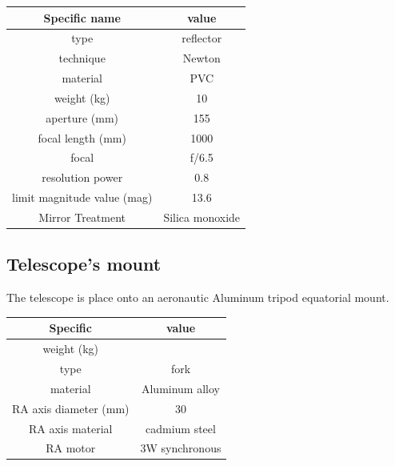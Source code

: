 \documentclass{article}
\begin{document}
\begin{multicols}{2}
\begin{minipage}{0.5\textwidth}
            \centering
            \begin{tabular}{c|c}
                Specific name & value \\
                \hline
                type & reflector \\
                technique & Newton  \\
                material & PVC  \\
                weight (kg) & 10 \\
                aperture (mm) & 155 \\
                focal length (mm) & 1000 \\
                focal & f/6.5 \\
                resolution power & 0.8 \\
                limit magnitude value (mag) & 13.6 \\
                Mirror Treatment & Silica monoxide \\
                \hline
            \end{tabular}
        \end{minipage}

        \subsection{Telescope's mount}
        The telescope is place onto an aeronautic Aluminum tripod equatorial mount.
        \\
        \begin{minipage}{.4\textwidth}
            \begin{tabular}{cc}
                Specific & value \\
                \hline
                weight (kg) & \\
                type & fork \\
                material & Aluminum alloy \\
                RA axis diameter (mm) & 30 \\
                RA axis material & cadmium steel \\
                RA motor & 3W synchronous \\
                \hline
            \end{tabular}
            \label{tab:mount}
        \end{minipage}


\end{multicols}
\end{document}
